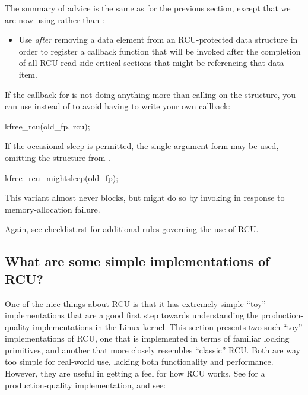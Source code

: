 The summary of advice is the same as for the previous section, except
that we are now using  rather than :

\begin{itemize}
\item	Use  \emph{after} removing a data element from an
	RCU-protected data structure in order to register a callback
	function that will be invoked after the completion of all RCU
	read-side critical sections that might be referencing that
	data item.
\end{itemize}

If the callback for  is not doing anything more than calling
 on the structure, you can use  instead of 
to avoid having to write your own callback:

\begin{VerbatimU}
	kfree_rcu(old_fp, rcu);
\end{VerbatimU}

If the occasional sleep is permitted, the single-argument form may
be used, omitting the  structure from .

\begin{VerbatimU}
	kfree_rcu_mightsleep(old_fp);
\end{VerbatimU}

This variant almost never blocks, but might do so by invoking
 in response to memory-allocation failure.

Again, see checklist.rst for additional rules governing the use of RCU\@.


\subsection{What are some simple implementations of RCU?}
\label{sec:rcu:What are some simple implementations of RCU?}

One of the nice things about RCU is that it has extremely simple ``toy''
implementations that are a good first step towards understanding the
production-quality implementations in the Linux kernel.
This section
presents two such ``toy'' implementations of RCU, one that is implemented
in terms of familiar locking primitives, and another that more closely
resembles ``classic'' RCU\@.
Both are way too simple for real-world use,
lacking both functionality and performance.
However, they are useful
in getting a feel for how RCU works.
See  for a
production-quality implementation, and see:

